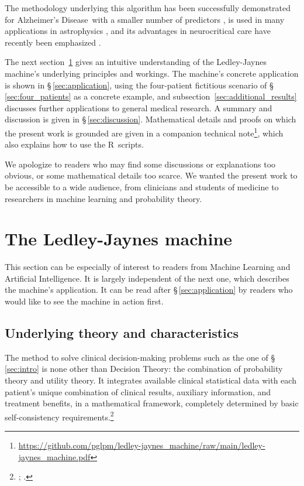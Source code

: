 \documentclass[utf8]{FrontiersinHarvard_mod} %
\newcommand*{\sect}{\S}%
\newcommand*{\chaps}{chs}%
\renewcommand*{\|}[1][]{\nonscript\:#1\vert\nonscript\:\mathopen{}}
\newcommand*{\ad}{Alzheimer's Disease}
\newcommand*{\ljm}{Ledley-Jaynes machine}
\begin{document}
The methodology underlying this algorithm has been successfully demonstrated for \ad\ with a smaller number of predictors \citep{antonianovillalobosetal2014}, is used in many applications in astrophysics \citep{eht2019,eht2022,delpozzoetal2018}, and its advantages in neurocritical care have recently been emphasized \citep{jawaetal2023}.

The next section~\ref{sec:the_machine} gives an intuitive understanding of the \ljm's underlying principles and workings. The machine's concrete application is shown in \sect\,\ref{sec:application}, using the four-patient fictitious scenario of \sect\,\ref{sec:four_patients} as a concrete example, and subsection~\ref{sec:additional_results} discusses further applications to general medical research. A summary and discussion is given in \sect\,\ref{sec:discussion}. Mathematical details and proofs on which the present work is grounded are given in a companion technical note\footnote{\url{https://github.com/pglpm/ledley-jaynes\_machine/raw/main/ledley-jaynes\_machine.pdf}}, which also explains how to use the R~scripts.

We apologize to readers who may find some discussions or explanations too obvious, or some mathematical details too scarce. We wanted the present work to be accessible to a wide audience, from clinicians and students of medicine to researchers in machine learning and probability theory.


\bigskip%
\section{The \ljm}
\label{sec:the_machine}

This section can be especially of interest to readers from Machine Learning and Artificial Intelligence. It is largely independent of the next one, which describes the machine's application. It can be read after \sect\,\ref{sec:application} by readers who would like to see the machine in action first.

\subsection{Underlying theory and characteristics}
\label{sec:the_machine_principles}

The method to solve clinical decision-making problems such as the one of \sect\,\ref{sec:intro} %
is none other than Decision Theory: the combination of probability theory and utility theory. It integrates available clinical statistical data with each patient's unique combination of clinical results, auxiliary information, and treatment benefits, in a mathematical framework, completely determined by basic self-consistency requirements.\footnote{\citet[\chaps~13--14]{jaynes1994_r2003}; \citet{vonneumannetal1944_r1955,cox1946,savage1954_r1972,luceetal1957,raiffaetal1961_r2000,raiffa1968_r1970,lindley1971_r1988,kreps1988}.}
\end{document}
